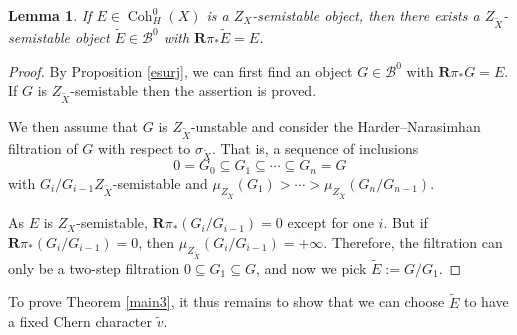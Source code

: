 \documentclass[12pt]{amsart}
\newtheorem{lemma}[theorem]{Lemma}
\theoremstyle{definition}
\DeclareMathOperator{\Coh}{Coh}
\begin{document}
\begin{lemma}\label{converse}
If $E \in \Coh^0_H(X)$ is a $Z_X$-semistable object,
then there exists a $Z_{\widetilde{X}}$-semistable object $\widetilde{E} \in \mathcal{B}^0$ with $\mathbf{R}\pi_\ast \widetilde{E}=E$.
\end{lemma}
\begin{proof}
By Proposition \ref{esurj}, we can first find an object $G \in \mathcal{B}^0$ with $\mathbf{R}\pi_\ast G=E$.
If $G$ is $Z_{\widetilde{X}}$-semistable then the assertion is proved.

We then assume that $G$ is $Z_{\widetilde{X}}$-unstable and consider the Harder--Narasimhan filtration of $G$ with respect to $\sigma_{\widetilde{X}}$.
That is, a sequence of inclusions
\[0=G_0 \subseteq G_1 \subseteq \cdots \subseteq G_n = G\]
with $G_i/G_{i-1} Z_{\widetilde{X}}$-semistable and $\mu_{Z_{\widetilde{X}}}(G_1) > \cdots > \mu_{Z_{\widetilde{X}}}(G_n/G_{n-1})$.

As $E$ is $Z_X$-semistable, $\mathbf{R}\pi_\ast(G_i/G_{i-1})=0$ except for one $i$.
But if $\mathbf{R}\pi_\ast(G_i/G_{i-1})=0$,
then $\mu_{Z_{\widetilde{X}}}(G_i/G_{i-1}) = + \infty$.
Therefore, the filtration can only be a two-step filtration $0 \subseteq G_1 \subseteq G$,
and now we pick $\widetilde{E}:= G/G_1$.
\end{proof}

To prove Theorem \ref{main3},
it thus remains to show that we can choose $\widetilde{E}$ to have a fixed Chern character $\widetilde{v}$.
\end{document}
